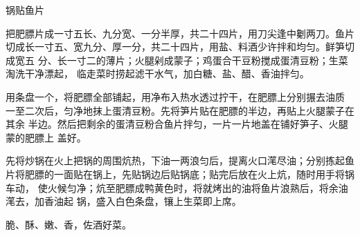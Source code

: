 %
%
%
%
%
%
%
\begin{recipe}{锅贴鱼片}

\ingredients


\preparation

\step 把肥膘片成一寸五长、九分宽、一分半厚，共二十四片，用刀尖逢中劖两刀。鱼片
切成长一寸五、宽九分、厚一分，共二十四片，用盐、料酒少许拌和均匀。鲜笋切成宽五
分、长一寸二的薄片；火腿剁成蒙子；鸡蛋合干豆粉搅成蛋清豆粉；生菜淘洗干净漂起，
临走菜时捞起滤干水气，加白糖、盐、醋、香油拌匀。

\step 用条盘一个，将肥膘全部铺起，用净布入热水透过拧干，在肥膘上分别搌去油质
一至二次后，匀净地抹上蛋清豆粉。先将笋片贴在肥膘的半边，再贴上火腿蒙子在其余
半边。然后把剩余的蛋清豆粉合鱼片拌匀，一片一片地盖在铺好笋子、火腿蒙的肥膘上
盖好。

\step 先将炒锅在火上把锅的周围炕热，下油一两浪匀后，提离火口滗尽油；分别拣起鱼
片将肥膘的一面贴在锅上，先贴锅边后贴锅底；贴完后放在火上炕，随时用手将锅车动，
使火候匀净；炕至肥膘成鸭黄色时，将就烤出的油将鱼片浪熟后，将余油滗去，加香油起
锅，盛入白色条盘，镶上生菜即上席。

\features

脆、酥、嫩、香，佐酒好菜。

\end{recipe}

